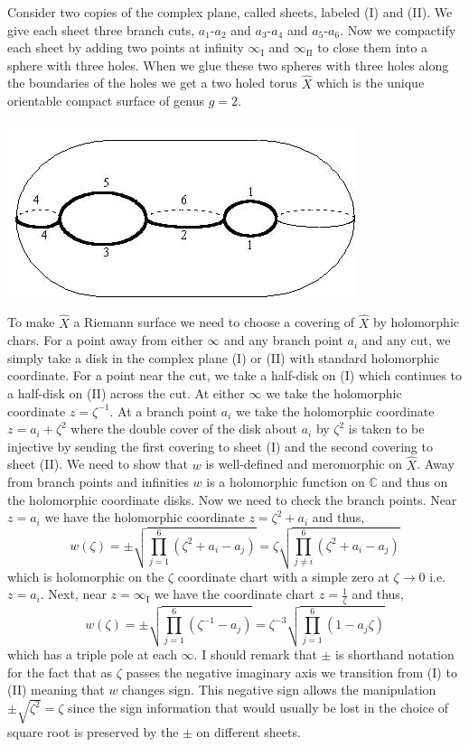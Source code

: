 \documentclass[12pt]{extarticle}
\newcommand{\C}{\mathbb{C}}
\theoremstyle{definition}
\begin{document}
Consider two copies of the complex plane, called sheets, labeled (I) and (II). We give each sheet three branch cuts, $a_1$-$a_2$ and $a_3$-$a_4$ and $a_5$-$a_6$. 
Now we compactify each sheet by adding two points at infinity $\infty_{\mathrm{I}}$ and $\infty_{\mathrm{II}}$ to close them into a sphere with three holes. When we glue these two spheres with three holes along the boundaries of the holes we get a two holed torus $\hat{X}$ which is the unique orientable compact surface of genus $g = 2$.  
\begin{center}
\includegraphics[scale=0.8]{TwoHoledTorus}
\end{center}
To make $\hat{X}$ a Riemann surface we need to choose a covering of $\hat{X}$ by holomorphic chars. For a point away from either $\infty$ and any branch point $a_i$ and any cut, we simply take a disk in the complex plane (I) or (II) with standard holomorphic coordinate. For a point near the cut, we take a half-disk on (I) which continues to a half-disk on (II) across the cut. At either $\infty$ we take the holomorphic coordinate $z = \zeta^{-1}$. At a branch point $a_i$ we take the holomorphic coordinate $z = a_i + \zeta^2$ where the double cover of the disk about $a_i$ by $\zeta^2$ is taken to be injective by sending the first covering to sheet (I) and the second covering to sheet (II). 
We need to show that $w$ is well-defined and meromorphic on $\hat{X}$. Away from branch points and infinities $w$ is a holomorphic function on $\C$ and thus on the holomorphic coordinate disks. Now we need to check the branch points. Near $z = a_i$ we have the holomorphic coordinate $z = \zeta^2 + a_i$ and thus,
\[ w(\zeta) = \pm \sqrt{\prod_{j = 1}^6 (\zeta^2 + a_i - a_j)} = \zeta \sqrt{\prod_{j \neq i}^6 (\zeta^2 + a_i - a_j)} \]
which is holomorphic on the $\zeta$ coordinate chart with a simple zero at $\zeta \to 0$ i.e. $z = a_i$. Next, near $z = \infty_{\mathrm{I}}$ we have the coordinate chart $z = \frac{1}{\zeta}$ and thus,
\[ w(\zeta) = \pm \sqrt{\prod_{j = 1}^6 (\zeta^{-1} - a_j)} = \zeta^{-3} \sqrt{\prod_{j = 1}^6 (1 - a_j \zeta)} \]
which has a triple pole at each $\infty$. I should remark that $\pm$ is shorthand notation for the fact that as $\zeta$ passes the negative imaginary axis we transition from (I) to (II) meaning that $w$ changes sign. This negative sign allows the manipulation $\pm \sqrt{\zeta^2} = \zeta$ since the sign information that would usually be lost in the choice of square root is preserved by the $\pm$ on different sheets. 
\end{document}
